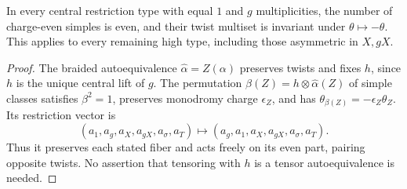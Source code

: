 \begin{lemma}\label{lem:1660-fiber-parity}
In every central restriction type with equal $1$ and $g$ multiplicities,
the number of charge-even simples is even, and their twist multiset is
invariant under $\theta\mapsto-\theta$. This applies to every remaining
high type, including those asymmetric in $X,gX$.
\end{lemma}
\begin{proof}
The braided autoequivalence $\widehat\alpha=Z(\alpha)$ preserves twists
and fixes $h$, since $h$ is the unique central lift of $g$.
The permutation $\beta(Z)=h\otimes\widehat\alpha(Z)$ of simple classes
satisfies $\beta^2=1$, preserves monodromy charge $\epsilon_Z$, and has
$\theta_{\beta(Z)}=-\epsilon_Z\theta_Z$. Its restriction vector is
\[
 (a_1,a_g,a_X,a_{gX},a_\sigma,a_T)
 \longmapsto(a_g,a_1,a_X,a_{gX},a_\sigma,a_T).
\]
Thus it preserves each stated fiber and acts freely on its even part,
pairing opposite twists. No assertion that tensoring with $h$ is a
tensor autoequivalence is needed.
\end{proof}

